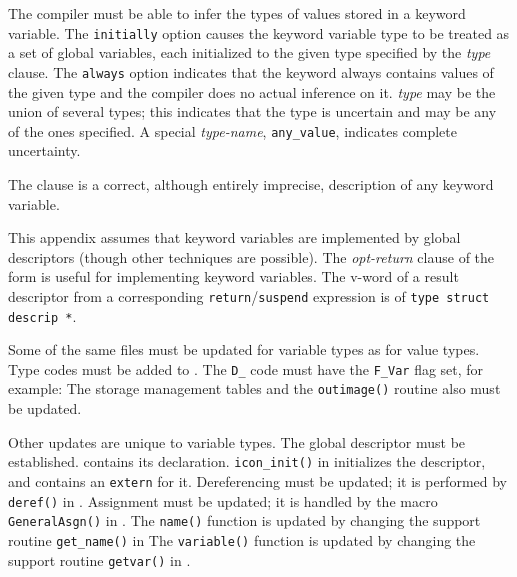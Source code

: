 The compiler must be able to infer the types of values stored in a
keyword variable. The \texttt{initially} option causes the keyword
variable type to be treated as a set of global variables, each
initialized to the given type specified by the \textit{type}
clause. The \texttt{always} option indicates that the keyword always
contains values of the given type and the compiler does no actual
inference on it. \textit{type} may be the union of several types; this
indicates that the type is uncertain and may be any of the ones
specified. A special \textit{type-name}, \texttt{any\_value},
indicates complete uncertainty.

\noindent The clause
\noindent
is a correct, although entirely imprecise, description of any keyword variable.

This appendix assumes that keyword variables are implemented by global
descriptors (though other techniques are possible). The \textit{opt-return}
clause of the form
\noindent
is useful for implementing keyword variables. The v-word of a result
descriptor from a corresponding \texttt{return}/\texttt{suspend}
expression is of \texttt{type struct descrip *}.


Some of the same files must be updated for variable types as for value
types. Type codes must be added to .
The \texttt{D\_} code must have the \texttt{F\_Var} flag set, for example:
\noindent
The storage management tables and the \texttt{outimage()} routine also must be
updated.


Other updates are unique to variable types. The global descriptor must be
established.  contains its declaration.
\texttt{icon\_init()} in  initializes the descriptor,
and  contains an \texttt{extern} for it. Dereferencing
must be updated; it is performed by \texttt{deref()} in .
Assignment must be updated; it is handled by the macro \texttt{GeneralAsgn()}
in . The \texttt{name()} function is updated by
changing the support routine \texttt{get\_name()} in 
The \texttt{variable()} function is updated by changing the support
routine \texttt{getvar()} in .

